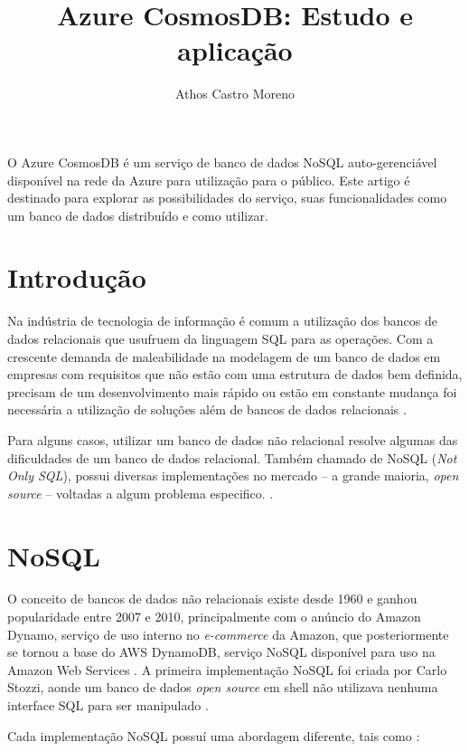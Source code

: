 \documentclass[12pt]{article}
\title{Azure CosmosDB: Estudo e aplicação}
\author{Athos Castro Moreno}
\begin{document}
 

\maketitle

\begin{resumo} 
	O Azure CosmosDB é um serviço de banco de dados NoSQL auto-gerenciável disponível na rede da Azure para utilização para o público. Este artigo é destinado para explorar as possibilidades
	do serviço, suas funcionalidades como um banco de dados distribuído e como utilizar. 
\end{resumo}

\section{Introdução}
Na indústria de tecnologia de informação é comum a utilização dos bancos de dados relacionais que usufruem da linguagem SQL para as operações. Com a crescente demanda
de maleabilidade na modelagem de um banco de dados em empresas com requisitos que não estão com uma estrutura de dados bem definida, precisam de um desenvolvimento mais rápido
ou estão em constante mudança foi necessária a utilização de soluções além de bancos de dados relacionais \cite{Oliveira2011}.

Para alguns casos, utilizar um banco de dados não relacional resolve algumas das dificuldades de um banco de dados relacional. Também chamado de NoSQL (\textit{Not Only SQL}),
possui diversas implementações no mercado -- a grande maioria, \textit{open source} -- voltadas a algum problema especifico. \cite{Pokorny2013}.

\section{NoSQL}
O conceito de bancos de dados não relacionais existe desde 1960 e ganhou popularidade entre 2007 e 2010, principalmente com o anúncio do Amazon Dynamo, serviço de uso interno no \textit{e-commerce}
da Amazon, que posteriormente se tornou a base do AWS DynamoDB, serviço NoSQL disponível para uso na Amazon Web Services \cite{DeCandia2007}.
A primeira implementação NoSQL foi criada por Carlo Stozzi, aonde um banco de dados \textit{open source} em shell não utilizava nenhuma interface SQL para ser manipulado \cite{Lith2010}. 

Cada implementação NoSQL possuí uma abordagem diferente, tais como \cite{Lith2010} \cite{Leavitt2010}:
\end{document}
